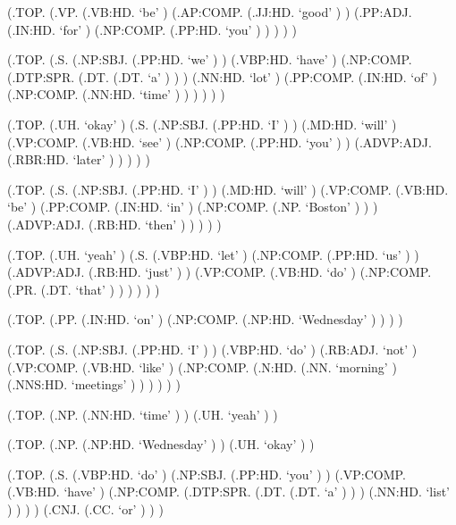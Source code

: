 \documentclass[10pt]{article}
\begin{document}
\begin{parsetree}  (.TOP. (.VP. (.VB:HD. `be' ) (.AP:COMP. (.JJ:HD. `good' ) ) (.PP:ADJ. (.IN:HD. `for' ) (.NP:COMP. (.PP:HD. `you' ) ) ) ) ) \end{parsetree}

\begin{parsetree}  (.TOP. (.S. (.NP:SBJ. (.PP:HD. `we' ) ) (.VBP:HD. `have' ) (.NP:COMP. (.DTP:SPR. (.DT. (.DT. `a' ) ) ) (.NN:HD. `lot' ) (.PP:COMP. (.IN:HD. `of' ) (.NP:COMP. (.NN:HD. `time' ) ) ) ) ) ) \end{parsetree}

\begin{parsetree}  (.TOP. (.UH. `okay' ) (.S. (.NP:SBJ. (.PP:HD. `I' ) ) (.MD:HD. `will' ) (.VP:COMP. (.VB:HD. `see' ) (.NP:COMP. (.PP:HD. `you' ) ) (.ADVP:ADJ. (.RBR:HD. `later' ) ) ) ) ) \end{parsetree}

\begin{parsetree}  (.TOP. (.S. (.NP:SBJ. (.PP:HD. `I' ) ) (.MD:HD. `will' ) (.VP:COMP. (.VB:HD. `be' ) (.PP:COMP. (.IN:HD. `in' ) (.NP:COMP. (.NP. `Boston' ) ) ) (.ADVP:ADJ. (.RB:HD. `then' ) ) ) ) ) \end{parsetree}

\begin{parsetree}  (.TOP. (.UH. `yeah' ) (.S. (.VBP:HD. `let' ) (.NP:COMP. (.PP:HD. `us' ) ) (.ADVP:ADJ. (.RB:HD. `just' ) ) (.VP:COMP. (.VB:HD. `do' ) (.NP:COMP. (.PR. (.DT. `that' ) ) ) ) ) ) \end{parsetree}

\begin{parsetree}  (.TOP. (.PP. (.IN:HD. `on' ) (.NP:COMP. (.NP:HD. `Wednesday' ) ) ) ) \end{parsetree}

\begin{parsetree}  (.TOP. (.S. (.NP:SBJ. (.PP:HD. `I' ) ) (.VBP:HD. `do' ) (.RB:ADJ. `not' ) (.VP:COMP. (.VB:HD. `like' ) (.NP:COMP. (.N:HD. (.NN. `morning' ) (.NNS:HD. `meetings' ) ) ) ) ) ) \end{parsetree}

\begin{parsetree}  (.TOP. (.NP. (.NN:HD. `time' ) ) (.UH. `yeah' ) ) \end{parsetree}

\begin{parsetree}  (.TOP. (.NP. (.NP:HD. `Wednesday' ) ) (.UH. `okay' ) ) \end{parsetree}

\begin{parsetree}  (.TOP. (.S. (.VBP:HD. `do' ) (.NP:SBJ. (.PP:HD. `you' ) ) (.VP:COMP. (.VB:HD. `have' ) (.NP:COMP. (.DTP:SPR. (.DT. (.DT. `a' ) ) ) (.NN:HD. `list' ) ) ) ) (.CNJ. (.CC. `or' ) ) ) \end{parsetree}
\end{document}
